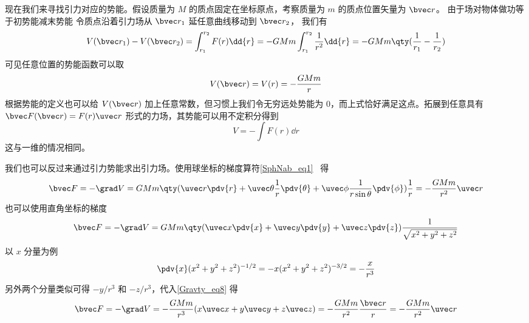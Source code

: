 现在我们来寻找引力对应的势能。假设质量为 $M$ 的质点固定在坐标原点，考察质量为 $m$ 的质点位置矢量为 $\bvec r$。 由于场对物体做功等于初势能减末势能
令质点沿着引力场从 ${\bvec r_1}$ 延任意曲线移动到 $\bvec r_2$， 我们有
\begin{equation}
V(\bvec r_1) - V(\bvec r_2) = \int_{r_1}^{r_2} F(r) \dd{r} =  - GMm\int_{r_1}^{r_2} \frac{1}{r^2} \dd{r}  =  - GMm \qty( \frac{1}{r_1} - \frac{1}{r_2} )
\end{equation}
可见任意位置的势能函数可以取
\begin{equation}
V(\bvec r) = V(r) = - \frac{GMm}{r}
\end{equation}
根据势能的定义也可以给 $V(\bvec r)$ 加上任意常数，但习惯上我们令无穷远处势能为 0，而上式恰好满足这点。拓展到任意具有 $\bvec F(\bvec r) = F(r)\uvec r$ 形式的力场，其势能可以用不定积分得到
\begin{equation}\label{Gravty_eq7}
V = -\int F(r) \dd{r}
\end{equation}
这与一维的情况相同。%

我们也可以反过来通过引力势能求出引力场。使用球坐标的梯度算符\autoref{SphNab_eq1}~ 得
\begin{equation}
\bvec F = -\grad V = GMm \qty( \uvec r\pdv{r} + \uvec \theta \frac{1}{r}\pdv{\theta} + \uvec \phi \frac{1}{r\sin \theta}\pdv{\phi} )\frac{1}{r} =  - \frac{GMm}{r^2}\uvec r
\end{equation}
也可以使用直角坐标的梯度
\begin{equation}\label{Gravty_eq8}
\bvec F = -\grad V = GMm \qty(\uvec x\pdv{x} + \uvec y\pdv{y} + \uvec z\pdv{z} )\frac{1}{\sqrt{x^2 + y^2 + z^2}}
\end{equation}
以 $x$ 分量为例
\begin{equation}
\pdv{x}(x^2 + y^2 + z^2)^{-1/2} =  - x(x^2 + y^2 + z^2)^{-3/2} =  - \frac{x}{r^3}
\end{equation}
另外两个分量类似可得 $- y/r^3$ 和 $- z/r^3$，代入\autoref{Gravty_eq8} 得
\begin{equation}
\bvec F = -\grad V =  - \frac{GMm}{r^3} (x\uvec x + y\uvec y + z\uvec z) =  - \frac{GMm}{r^2}\frac{\bvec r}{r} =  - \frac{GMm}{r^2}\uvec r
\end{equation}
